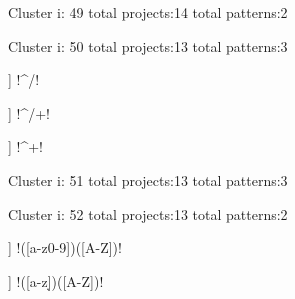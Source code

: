 Cluster i: 49
total projects:14
total patterns:2
\begin{multicols}{1}
\begin{description}[noitemsep,topsep=0pt]
\item [[9] ] \cverb!(|~{)!
\item [[8] ] \cverb!(\x1b|~{)!
\end{description}
\end{multicols}







Cluster i: 50
total projects:13
total patterns:3
\begin{multicols}{1}
\begin{description}[noitemsep,topsep=0pt]
\item [[9] ] \cverb!^/!
\item [[5] ] \cverb!^/+!
\item [[5] ] \cverb!^\/+!
\end{description}
\end{multicols}







Cluster i: 51
total projects:13
total patterns:3
\begin{multicols}{1}
\end{multicols}







Cluster i: 52
total projects:13
total patterns:2
\begin{multicols}{1}
\begin{description}[noitemsep,topsep=0pt]
\item [[9] ] \cverb!([a-z0-9])([A-Z])!
\item [[4] ] \cverb!([a-z\d])([A-Z])!
\end{description}
\end{multicols}







